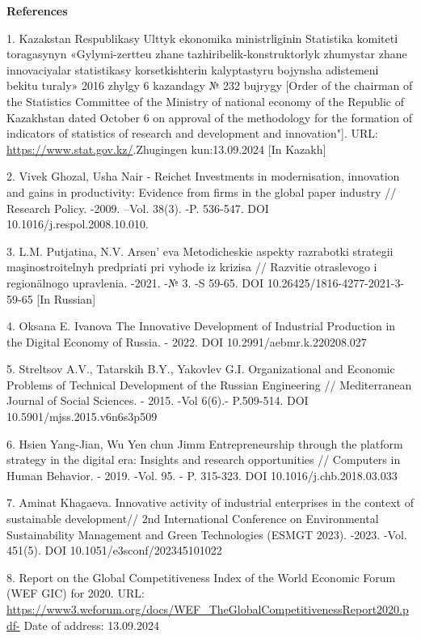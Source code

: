 {\bfseries References}

1. Kazakstan Respublikasy Ulttyk ekonomika ministrlіgіnіn Statistika
komitetі toragasynyn «Gylymi-zertteu zhane tazhіribelіk-konstruktorlyk
zhumystar zhane innovaciyalar statistikasy korsetkіshterіn kalyptastyru
bojynsha adіstemenі bekіtu turaly» 2016 zhylgy 6 kazandagy № 232 bujrygy
{[}Order of the chairman of the Statistics Committee of the Ministry of
national economy of the Republic of Kazakhstan dated October 6 on
approval of the methodology for the formation of indicators of
statistics of research and development and innovation"{]}. URL:
\url{https://www.stat.gov.kz/}.Zhugingen kun:13.09.2024 {[}In Kazakh{]}

2. Vivek Ghozal, Usha Nair - Reichet Investments in modernisation,
innovation and gains in productivity: Evidence from firms in the global
paper industry // Research Policy. -2009. --Vol. 38(3). -P. 536-547. DOI
10.1016/j.respol.2008.10.010.

3. L.M. Putjatina, N.V. Arsen' eva Metodicheskie aspekty
razrabotki strategii maşinostroitelnyh predpriati pri vyhode iz krizisa
// Razvitie otraslevogo i regionälnogo upravlenia. -2021. -№ 3. -S
59-65. DOI 10.26425/1816-4277-2021-3-59-65 {[}In Russian{]}

4. Oksana E. Ivanova The Innovative Development of Industrial Production
in the Digital Economy of Russia. - 2022. DOI 10.2991/aebmr.k.220208.027

5. Streltsov A.V., Tatarskih B.Y., Yakovlev G.I. Organizational and
Economic Problems of Technical Development of the Russian Engineering //
Mediterranean Journal of Social Sciences. - 2015. -Vol 6(6).- P.509-514.
DOI 10.5901/mjss.2015.v6n6s3p509

6. Hsien Yang-Jian, Wu Yen chun Jimm Entrepreneurship through the
platform strategy in the digital era: Insights and research
opportunities // Computers in Human Behavior. - 2019. -Vol. 95. - P.
315-323. DOI 10.1016/j.chb.2018.03.033

7. Aminat Khagaeva. Innovative activity of industrial enterprises in the
context of sustainable development// 2nd International Conference on
Environmental Sustainability Management and Green Technologies (ESMGT
2023). -2023. -Vol. 451(5). DOI 10.1051/e3sconf/202345101022

8. Report on the Global Competitiveness Index of the World Economic
Forum (WEF GIC) for 2020. URL:
\url{https://www3.weforum.org/docs/WEF_TheGlobalCompetitivenessReport2020.pdf-}
Date of address: 13.09.2024

